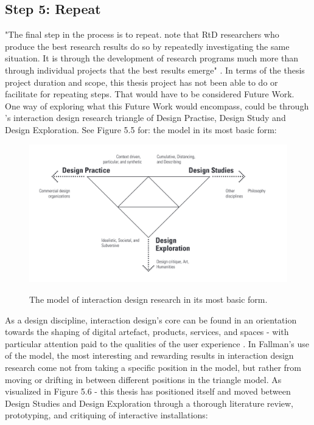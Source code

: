 \subsection{Step 5: Repeat}
"The final step in the process is to repeat. \autocite{koskinen_2013} note that RtD researchers who produce the best research results do so by repeatedly investigating the same situation. It is through the development of research programs much more than through individual projects that the best results emerge" \autocite[p. 186]{zimmerman_research_2014}. In terms of the thesis project duration and scope, this thesis project has not been able to do or facilitate for repeating steps. That would have to be considered Future Work. One way of exploring what this Future Work would encompass, could be through  \autocite{fallman_triangle_2008}'s interaction design research triangle of Design Practise, Design Study and Design Exploration. See Figure 5.5 for: the model in its most basic form: 

\begin{figure}[H]
\centering
\includegraphics[width=12.5cm]{pictures/methodology/fallman_triangle.png}
\caption{The model of interaction design research in its most basic form.}
\autocite[p. 5]{fallman_triangle_2008}
\end{figure}

As a design discipline, interaction design’s core can be found in an orientation towards the shaping of digital artefact, products, services, and spaces - with particular attention paid to the qualities of the user experience \autocite[p. 4]{fallman_triangle_2008}. In Fallman’s use of the model, the most interesting and rewarding results in interaction design research come not from taking a specific position in the model, but rather from moving or drifting in between different positions in the triangle model. As visualized in Figure 5.6 - this thesis has positioned itself and moved between Design Studies and Design Exploration through a thorough literature review, prototyping, and critiquing of interactive installations: 

